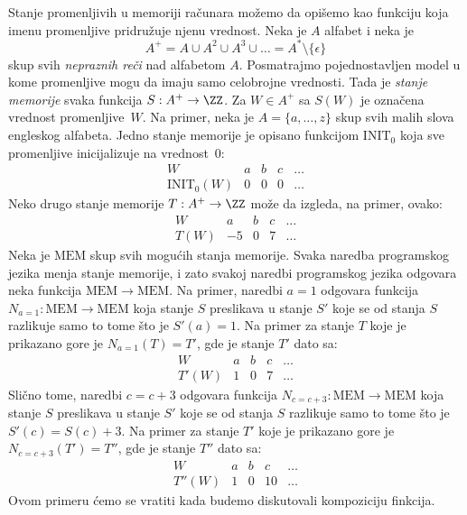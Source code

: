 \begin{EX}\label{ft08.ex.stanje-mem}
  Stanje promenljivih u memoriji ra\v cunara mo\v zemo da opi\v semo kao funkciju koja imenu promenljive
  pridru\v zuje njenu vrednost. Neka je $A$ alfabet i neka je
  $$
    A^+ = A \cup A^2 \cup A^3 \cup \ldots = A^* \setminus \{\epsilon\}
  $$
  skup svih \emph{nepraznih re\v ci} nad alfabetom $A$. Posmatrajmo pojednostavljen model u kome promenljive mogu da imaju
  samo celobrojne vrednosti. Tada je \emph{stanje memorije} svaka funkcija $S : A^+ \to \ZZ$. Za $W \in A^+$ sa $S(W)$ je
  ozna\v cena vrednost promenljive~$W$. Na primer, neka je $A = \{a, \ldots, z\}$ skup svih malih slova engleskog alfabeta.
  Jedno stanje memorije je opisano funkcijom $\mathrm{INIT}_0$ koja sve promenljive inicijalizuje na vrednost~0:
  $$
    \begin{array}{c|cccc}
      W & a & b & c & \ldots\\
      \hline
      \mathrm{INIT}_0(W) & 0 & 0 & 0 & \ldots
    \end{array}
  $$
  Neko drugo stanje memorije $T : A^+ \to \ZZ$ mo\v ze da izgleda, na primer, ovako:
  $$
    \begin{array}{c|cccc}
      W & a & b & c & \ldots\\
      \hline
      T(W) & -5 & 0 & 7 & \ldots
    \end{array}
  $$
  Neka je $\mathrm{MEM}$ skup svih mogu\'cih stanja memorije. Svaka naredba programskog jezika menja stanje memorije,
  i zato svakoj naredbi programskog jezika odgovara neka funkcija $\mathrm{MEM} \to \mathrm{MEM}$. Na primer, naredbi
  $a = 1$ odgovara funkcija\break
  $N_{a = 1} : \mathrm{MEM} \to \mathrm{MEM}$ koja stanje $S$ preslikava u stanje $S'$ koje se od
  stanja $S$ razlikuje samo to tome \v sto je $S'(a) = 1$. Na primer za stanje $T$ koje je prikazano gore
  je $N_{a = 1}(T) = T'$, gde je stanje $T'$ dato sa:
  $$
    \begin{array}{c|cccc}
      W & a & b & c & \ldots\\
      \hline
      T'(W) & 1 & 0 & 7 & \ldots
    \end{array}
  $$
  Sli\v cno tome, naredbi $c = c + 3$ odgovara funkcija $N_{c = c + 3} : \mathrm{MEM} \to \mathrm{MEM}$
  koja stanje $S$ preslikava u stanje $S'$ koje se od stanja $S$ razlikuje samo to tome \v sto je $S'(c) = S(c) + 3$.
  Na primer za stanje $T'$ koje je prikazano gore je $N_{c = c + 3}(T') = T''$, gde je stanje $T''$ dato sa:
  $$
    \begin{array}{c|cccc}
      W & a & b & c & \ldots\\
      \hline
      T''(W) & 1 & 0 & 10 & \ldots
    \end{array}
  $$
  Ovom primeru \'cemo se vratiti kada budemo diskutovali kompoziciju finkcija.
\end{EX}

